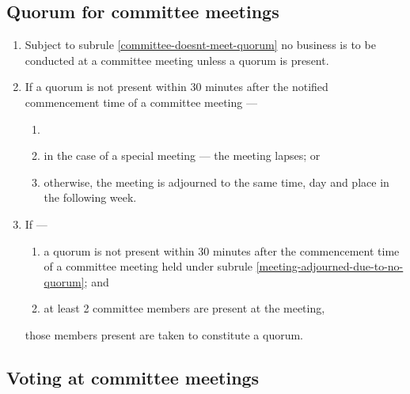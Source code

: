 \documentclass[../constitution.tex]{subfiles}
\begin{document}
\hypertarget{quorum-for-committee-meetings}{%
\subsection{Quorum for committee meetings}\label{quorum-for-committee-meetings}}

\begin{enumerate}

\item Subject to subrule \ref{committee-doesnt-meet-quorum} no business is to be conducted at a committee meeting unless a quorum is present.
\item If a quorum is not present within 30 minutes after the notified commencement time of a committee meeting --- \label{no-quorum-after-30min}

  \begin{enumerate}
  
  \item 
  \item in the case of a special meeting --- the meeting lapses; or
  \item otherwise, the meeting is adjourned to the same time, day and place in the following week. \label{meeting-adjourned-due-to-no-quorum}
  \end{enumerate}
\item If ---

  \begin{enumerate}
  
  \item a quorum is not present within 30 minutes after the commencement time of a committee meeting held under subrule \ref{meeting-adjourned-due-to-no-quorum}; and
  \item at least 2 committee members are present at the meeting,
  \end{enumerate}

  those members present are taken to constitute a quorum.

\end{enumerate}

\hypertarget{voting-at-committee-meetings}{%
\subsection{Voting at committee meetings}\label{voting-at-committee-meetings}}
\end{document}
